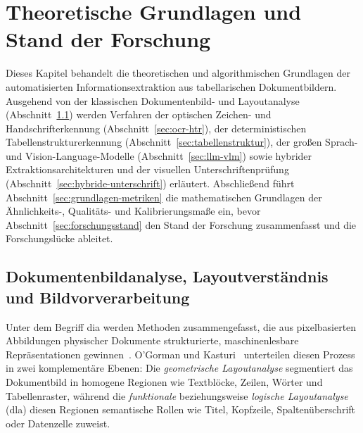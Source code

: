 \chapter{Theoretische Grundlagen und Stand der Forschung}
\label{chap:grundlagen}

Dieses Kapitel behandelt die theoretischen und algorithmischen Grundlagen der automatisierten Informationsextraktion aus tabellarischen Dokumentbildern. Ausgehend von der klassischen Dokumentenbild- und Layoutanalyse (Abschnitt~\ref{sec:dia-dla}) werden Verfahren der optischen Zeichen- und Handschrifterkennung (Abschnitt~\ref{sec:ocr-htr}), der deterministischen Tabellenstrukturerkennung (Abschnitt~\ref{sec:tabellenstruktur}), der großen Sprach- und Vision-Language-Modelle (Abschnitt~\ref{sec:llm-vlm}) sowie hybrider Extraktionsarchitekturen und der visuellen Unterschriftenprüfung (Abschnitt~\ref{sec:hybride-unterschrift}) erläutert. Abschließend führt Abschnitt~\ref{sec:grundlagen-metriken} die mathematischen Grundlagen der Ähnlichkeits-, Qualitäts- und Kalibrierungsmaße ein, bevor Abschnitt~\ref{sec:forschungsstand} den Stand der Forschung zusammenfasst und die Forschungslücke ableitet.

\section{Dokumentenbildanalyse, Layoutverständnis und Bildvorverarbeitung}
\label{sec:dia-dla}

Unter dem Begriff \ac{dia} werden Methoden zusammengefasst, die aus pixelbasierten Abbildungen physischer Dokumente strukturierte, maschinenlesbare Repräsentationen gewinnen~\cite{OGorman1997DIA}. O'Gorman und Kasturi~\cite{OGorman1997DIA} unterteilen diesen Prozess in zwei komplementäre Ebenen: Die \emph{geometrische Layoutanalyse} segmentiert das Dokumentbild in homogene Regionen wie Textblöcke, Zeilen, Wörter und Tabellenraster, während die \emph{funktionale} beziehungsweise \emph{logische Layoutanalyse} (\ac{dla}) diesen Regionen semantische Rollen wie Titel, Kopfzeile, Spaltenüberschrift oder Datenzelle zuweist.

